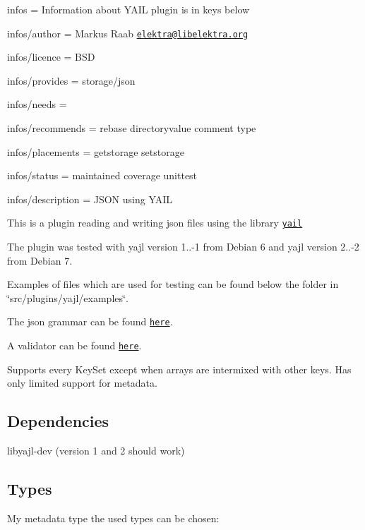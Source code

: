 
\begin{DoxyItemize}
\item infos = Information about Y\+A\+I\+L plugin is in keys below
\item infos/author = Markus Raab \href{mailto:elektra@libelektra.org}{\tt elektra@libelektra.\+org}
\item infos/licence = B\+S\+D
\item infos/provides = storage/json
\item infos/needs =
\item infos/recommends = rebase directoryvalue comment type
\item infos/placements = getstorage setstorage
\item infos/status = maintained coverage unittest
\item infos/description = J\+S\+O\+N using Y\+A\+I\+L
\end{DoxyItemize}

This is a plugin reading and writing json files using the library \href{http://lloyd.github.com/yajl/}{\tt yail}

The plugin was tested with yajl version 1..-\/1 from Debian 6 and yajl version 2..-\/2 from Debian 7.

Examples of files which are used for testing can be found below the folder in \char`\"{}src/plugins/yajl/examples\char`\"{}.

The json grammar can be found \href{http://www.ietf.org/rfc/rfc4627.txt}{\tt here}.

A validator can be found \href{http://jsonlint.com/}{\tt here}.

Supports every Key\+Set except when arrays are intermixed with other keys. Has only limited support for metadata.

\subsection*{Dependencies}


\begin{DoxyItemize}
\item {\ttfamily libyajl-\/dev} (version 1 and 2 should work)
\end{DoxyItemize}

\subsection*{Types}

My metadata {\ttfamily type} the used types can be chosen\+:


